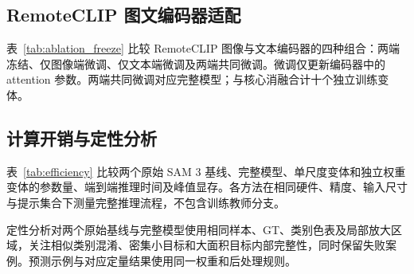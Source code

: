 \subsection{RemoteCLIP 图文编码器适配}

表~\ref{tab:ablation_freeze} 比较 RemoteCLIP 图像与文本编码器的四种组合：两端冻结、仅图像端微调、仅文本端微调及两端共同微调。微调仅更新编码器中的 attention 参数。两端共同微调对应完整模型；与核心消融合计十个独立训练变体。

\subsection{计算开销与定性分析}

表~\ref{tab:efficiency} 比较两个原始 SAM 3 基线、完整模型、单尺度变体和独立权重变体的参数量、端到端推理时间及峰值显存。各方法在相同硬件、精度、输入尺寸与提示集合下测量完整推理流程，不包含训练教师分支。

定性分析对两个原始基线与完整模型使用相同样本、GT、类别色表及局部放大区域，关注相似类别混淆、密集小目标和大面积目标内部完整性，同时保留失败案例。预测示例与对应定量结果使用同一权重和后处理规则。

\FloatBarrier
